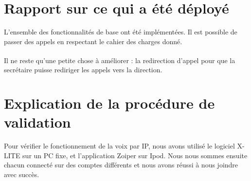 \documentclass[a4paper,12pt]{article}
\begin{document}
\section{Rapport sur ce qui a été déployé}
	\paragraph{} L'ensemble des fonctionnalités de base ont été implémentées. Il est possible de passer des appels en respectant le cahier des charges donné. 
	\paragraph{} Il ne reste qu'une petite chose à améliorer : la redirection d'appel pour que la secrétaire puisse rediriger les appels vers la direction.
	
\section{Explication de la procédure de validation}
	\paragraph{} Pour vérifier le fonctionnement de la voix par IP, nous avons utilisé le logiciel X-LITE sur un PC fixe, et l'application Zoiper sur Ipod. Nous nous sommes ensuite chacun connecté sur des comptes différents et nous avons réussi à nous joindre avec succès. 
\end{document}
